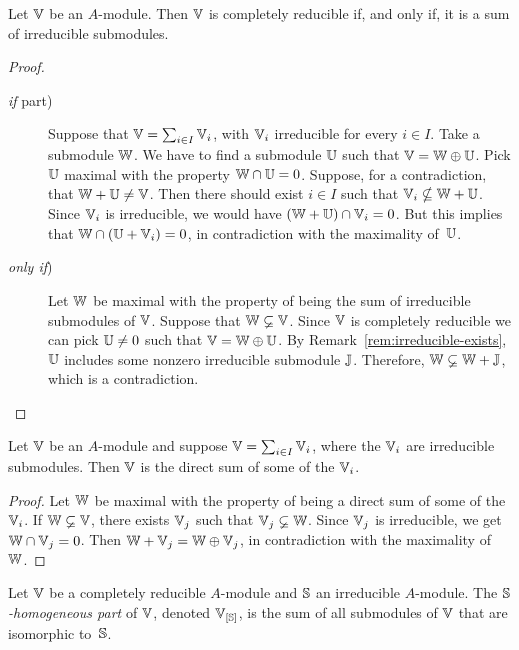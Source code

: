\begin{thm}\label{thm:sum-of-irreducible}
    Let\/ $\mathbb V$ be an\/ $A$-module. Then\/ $\mathbb V$ is completely reducible if, and only if, it is a sum of irreducible submodules.
\end{thm}

\begin{proof}${}$
    \begin{description}
        \item[\rm\textit{if\/} part)] Suppose that $\mathbb V=\sum_{i\in I}\mathbb V_i$, with $\mathbb V_i$ irreducible for every $i\in I$. Take a submodule $\mathbb W$. We have to find a submodule $\mathbb U$ such that $\mathbb V=\mathbb W\oplus\mathbb U$. Pick $\mathbb U$ maximal with the property $\mathbb W\cap\mathbb U=0$. Suppose, for a contradiction, that $\mathbb W+\mathbb U\ne\mathbb V$. Then there should exist $i\in I$ such that $\mathbb V_i\nsubseteq\mathbb W+\mathbb U$. Since $\mathbb V_i$ is irreducible, we would have $(\mathbb W+\mathbb U)\cap\mathbb V_i=0$. But this implies that $\mathbb W\cap(\mathbb U+\mathbb V_i)=0$, in contradiction with the maximality of~$\mathbb U$.

        \item[\rm\textit{only if})] Let $\mathbb W$ be maximal with the property of being the sum of irreducible submodules of $\mathbb V$. Suppose that $\mathbb W\varsubsetneq\mathbb V$. Since $\mathbb V$ is completely reducible we can pick $\mathbb U\ne0$ such that $\mathbb V=\mathbb W\oplus\mathbb U$. By Remark~\ref{rem:irreducible-exists}, $\mathbb U$ includes some nonzero irreducible submodule $\mathbb J$. Therefore, $\mathbb W\varsubsetneq\mathbb W+\mathbb J$, which is a contradiction.
    \end{description}
\end{proof}

\begin{lem}\label{lem:irreducible-sum-implies-oplus}
    Let\/ $\mathbb V$ be an\/ $A$-module and suppose\/ $\mathbb V = \sum_{i\in I} \mathbb V_i$, where the\/ $\mathbb V_i$ are irreducible submodules. Then\/ $\mathbb V$ is the direct sum of some of the\/ $\mathbb V_i$.
\end{lem}

\begin{proof}
    Let $\mathbb W$ be maximal with the property of being a direct sum of some of the $\mathbb V_i$. If $\mathbb W\varsubsetneq\mathbb V$, there exists $\mathbb V_j$ such that $\mathbb V_j\varsubsetneq\mathbb W$. Since $\mathbb V_j$ is irreducible, we get $\mathbb W\cap\mathbb V_j=0$. Then $\mathbb W+\mathbb V_j=\mathbb W\oplus\mathbb V_j$, in contradiction with the maximality of~$\mathbb W$.
\end{proof}

\begin{defn}
    Let\/ $\mathbb V$ be a completely reducible\/ $A$-module and $\mathbb S$ an irreducible\/ $A$-module. The \textsl{$\mathbb S$-homogeneous part} of\/ $\mathbb V$, denoted\/ $\mathbb V_{[\mathbb S]}$, is the sum of all submodules of\/ $\mathbb V$ that are isomorphic to\/~$\mathbb S$.
\end{defn}

